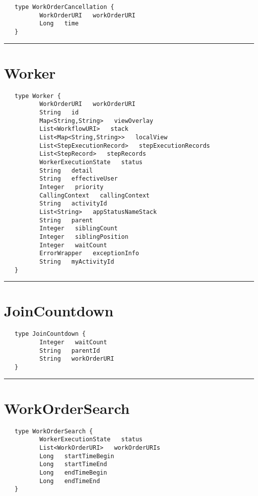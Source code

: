 \begin{verbatim}
   type WorkOrderCancellation {
          WorkOrderURI   workOrderURI
          Long   time
   }
\end{verbatim}

\rule{15cm}{2pt}
\section{Worker}
\label{type:Worker}

\begin{verbatim}
   type Worker {
          WorkOrderURI   workOrderURI
          String   id
          Map<String,String>   viewOverlay
          List<WorkflowURI>   stack
          List<Map<String,String>>   localView
          List<StepExecutionRecord>   stepExecutionRecords
          List<StepRecord>   stepRecords
          WorkerExecutionState   status
          String   detail
          String   effectiveUser
          Integer   priority
          CallingContext   callingContext
          String   activityId
          List<String>   appStatusNameStack
          String   parent
          Integer   siblingCount
          Integer   siblingPosition
          Integer   waitCount
          ErrorWrapper   exceptionInfo
          String   myActivityId
   }
\end{verbatim}

\rule{15cm}{2pt}
\section{JoinCountdown}
\label{type:JoinCountdown}

\begin{verbatim}
   type JoinCountdown {
          Integer   waitCount
          String   parentId
          String   workOrderURI
   }
\end{verbatim}

\rule{15cm}{2pt}
\section{WorkOrderSearch}
\label{type:WorkOrderSearch}

\begin{verbatim}
   type WorkOrderSearch {
          WorkerExecutionState   status
          List<WorkOrderURI>   workOrderURIs
          Long   startTimeBegin
          Long   startTimeEnd
          Long   endTimeBegin
          Long   endTimeEnd
   }
\end{verbatim}

